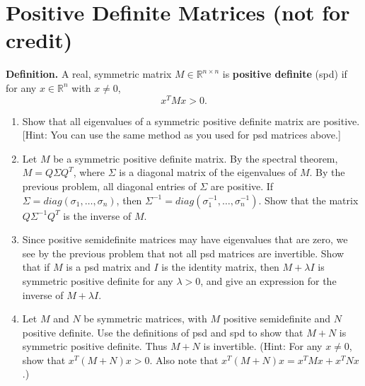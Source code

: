 \documentclass{article}
\theoremstyle{plain}
\theoremstyle{definition}
\begin{document}
\section{Positive Definite Matrices (not for credit)}
{\bf Definition. }
A real, symmetric matrix $M\in\mathbb{R}^{n\times n}$ is \textbf{positive
definite} (spd) if for any $x\in\mathbb{R}^{n}$ with $x\neq0$, 
\[
x^{T}Mx>0.
\]
\begin{enumerate}
\item Show that all eigenvalues of a symmetric positive definite matrix
are positive. {[}Hint: You can use the same method as you used for
psd matrices above.{]} 
\item Let $M$ be a symmetric positive definite matrix. By the spectral
theorem, $M=Q\Sigma Q^{T}$, where $\Sigma$ is a diagonal matrix
of the eigenvalues of $M$. By the previous problem, all diagonal
entries of $\Sigma$ are positive. If $\Sigma=diag\left(\sigma_{1},\ldots,\sigma_{n}\right)$,
then $\Sigma^{-1}=diag\left(\sigma_{1}^{-1},\ldots,\sigma_{n}^{-1}\right)$.
Show that the matrix $Q\Sigma^{-1}Q^{T}$ is the inverse of $M$. 
\item Since positive semidefinite matrices may have eigenvalues that are
zero, we see by the previous problem that not all psd matrices are
invertible. Show that if $M$ is a psd matrix and $I$ is the identity
matrix, then $M+\lambda I$ is symmetric positive definite for any
$\lambda>0$, and give an expression for the inverse of $M+\lambda I$.
\item Let $M$ and $N$ be symmetric matrices, with $M$ positive semidefinite
and $N$ positive definite. Use the definitions of psd and spd to
show that $M+N$ is symmetric positive definite. Thus $M+N$ is invertible.
(Hint: For any $x\neq0$, show that $x^{T}(M+N)x>0$. Also note that
$x^{T}(M+N)x=x^{T}Mx+x^{T}Nx$.) 
\end{enumerate}
\end{document}
